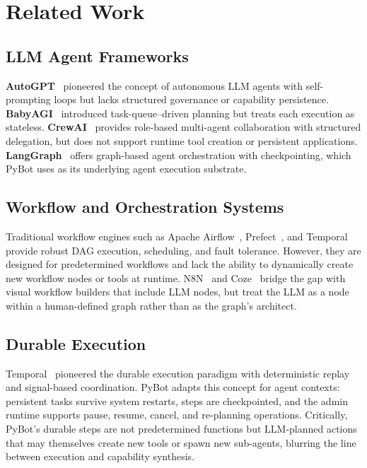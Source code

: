 \documentclass[11pt,a4paper]{article}
\begin{document}
\section{Related Work}
\label{sec:related}

\subsection{LLM Agent Frameworks}

\textbf{AutoGPT}~\cite{autogpt2023} pioneered the concept of autonomous LLM agents with self-prompting loops but lacks structured governance or capability persistence.
\textbf{BabyAGI}~\cite{babyagi2023} introduced task-queue--driven planning but treats each execution as stateless.
\textbf{CrewAI}~\cite{crewai2024} provides role-based multi-agent collaboration with structured delegation, but does not support runtime tool creation or persistent applications.
\textbf{LangGraph}~\cite{langgraph2024} offers graph-based agent orchestration with checkpointing, which PyBot uses as its underlying agent execution substrate.

\subsection{Workflow and Orchestration Systems}

Traditional workflow engines such as Apache Airflow~\cite{airflow2015}, Prefect~\cite{prefect2024}, and Temporal~\cite{temporal2023} provide robust DAG execution, scheduling, and fault tolerance.
However, they are designed for predetermined workflows and lack the ability to dynamically create new workflow nodes or tools at runtime.
N8N~\cite{n8n2024} and Coze~\cite{coze2024} bridge the gap with visual workflow builders that include LLM nodes, but treat the LLM as a node within a human-defined graph rather than as the graph's architect.

\subsection{Durable Execution}

Temporal~\cite{temporal2023} pioneered the durable execution paradigm with deterministic replay and signal-based coordination.
PyBot adapts this concept for agent contexts: persistent tasks survive system restarts, steps are checkpointed, and the admin runtime supports pause, resume, cancel, and re-planning operations.
Critically, PyBot's durable steps are not predetermined functions but LLM-planned actions that may themselves create new tools or spawn new sub-agents, blurring the line between execution and capability synthesis.
\end{document}
